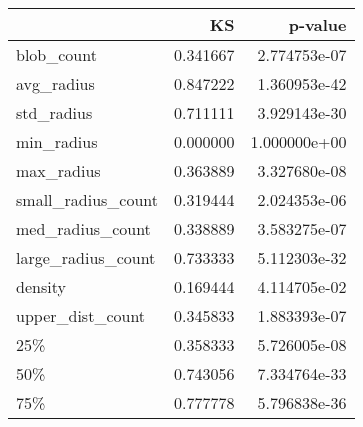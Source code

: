 \begin{tabular}{lrr}
\toprule
{} &        KS &       p-value \\
\midrule
blob\_count         &  0.341667 &  2.774753e-07 \\
avg\_radius         &  0.847222 &  1.360953e-42 \\
std\_radius         &  0.711111 &  3.929143e-30 \\
min\_radius         &  0.000000 &  1.000000e+00 \\
max\_radius         &  0.363889 &  3.327680e-08 \\
small\_radius\_count &  0.319444 &  2.024353e-06 \\
med\_radius\_count   &  0.338889 &  3.583275e-07 \\
large\_radius\_count &  0.733333 &  5.112303e-32 \\
density            &  0.169444 &  4.114705e-02 \\
upper\_dist\_count   &  0.345833 &  1.883393e-07 \\
25\%                &  0.358333 &  5.726005e-08 \\
50\%                &  0.743056 &  7.334764e-33 \\
75\%                &  0.777778 &  5.796838e-36 \\
\bottomrule
\end{tabular}

